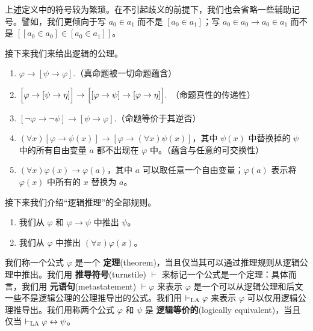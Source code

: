 \begin{remark}
  上述定义中的符号较为繁琐。在不引起歧义的前提下，我们也会省略一些辅助记号。譬如，我们更倾向于写 \(a_0\in a_1\) 而不是 \([a_0\in a_1]\)；写 \(a_0\in a_0\rightarrow a_0\in a_1\) 而不是 \([[a_0\in a_0]\in [a_0\in a_1]]\)。
\end{remark}

接下来我们来给出逻辑的公理。

\begin{axiom}\emptyline \label{axiom:逻辑公理}
  \begin{enumerate}
    \item \(\varphi\to[\psi\to\varphi].\)（真命题被一切命题蕴含）
    \item \(\Bigl[\varphi\to[\psi\to\eta]\Bigr]\to\Bigl[[\varphi\to\psi]\to[\varphi\to\eta]\Bigr].\) （命题真性的传递性）
    \item \([\lnot \varphi\to\lnot \psi]\to[\psi\to\varphi].\)（命题等价于其逆否）
    \item \((\forall x)[\varphi\to\psi(x)]\to[\varphi\to(\forall x)\psi(x)]\)，其中 \(\psi(x)\) 中替换掉的 \(\psi\) 中的所有自由变量 \(a\) 都不出现在 \(\varphi\) 中。（蕴含与任意的可交换性）
    \item \((\forall x)\varphi(x)\to\varphi(a)\)，其中 \(a\) 可以取任意一个自由变量；\(\varphi(a)\) 表示将 \(\varphi(x)\) 中所有的 \(x\) 替换为 \(a\)。
  \end{enumerate}
\end{axiom}

接下来我们介绍“逻辑推理”的全部规则。

\begin{axiom}[推理规则]\emptyline 
  \begin{enumerate}
    \item 我们从 \(\varphi\) 和 \(\varphi\to\psi\) 中推出 \(\psi\)。
    \item 我们从 \(\varphi\) 中推出 \((\forall x)\varphi(x)\)。
  \end{enumerate}
\end{axiom}

\begin{definition}[定理]
  我们称一个公式 \(\varphi\) 是一个 \textbf{定理}(theorem)，当且仅当其可以通过推理规则从逻辑公理中推出。我们用 \textbf{推导符号}(turnstile) \(\vdash\) 来标记一个公式是一个定理：具体而言，我们用 \textbf{元语句}(metastatement) \(\vdash\varphi\) 来表示 \(\varphi\) 是一个可以从逻辑公理和后文一些不是逻辑公理的公理推导出的公式。我们用 \(\vdash_{\text{LA}} \varphi\) 来表示 \(\varphi\) 可以仅用逻辑公理推导出。我们用称两个公式 \(\varphi\) 和 \(\psi\) 是 \textbf{逻辑等价的}(logically equivalent)，当且仅当 \(\vdash_{\text{LA}} \varphi\leftrightarrow\psi\)。
\end{definition}